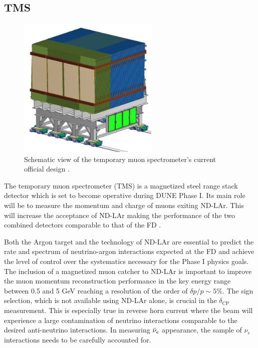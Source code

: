 \subsection{TMS}
\label{Sec:TMS-Official}
\begin{figure}[t]
     \centering
     \includegraphics[width=0.6\textwidth]{figures/ch3-DUNE/TMS.png}
     \caption[Schematic view of the temporary muon spectrometer's current official design.]{Schematic view of the temporary muon spectrometer's current official design \cite{Battisti:2022ND}.}
        \label{fig:TMS}
\end{figure}
The temporary muon spectrometer (TMS) is a magnetized steel range stack detector which is set to become operative during DUNE Phase I. Its main role will be to measure the momentum and charge of muons exiting ND-LAr. This will increase the acceptance of ND-LAr making the performance of the two combined detectors comparable to that of the FD \cite{DUNE:2022aul}.

Both the Argon target and the technology of ND-LAr are essential to predict the rate and spectrum of neutrino-argon interactions expected at the FD and achieve the level of control over the systematics necessary for the Phase I physics goals. The inclusion of a magnetized muon catcher to ND-LAr is important to improve the muon momentum reconstruction performance in the key energy range between 0.5 and 5 GeV reaching a resolution of the order of $\delta p / p \sim 5\%$. The sign selection, which is not available using ND-LAr alone, is crucial in the $\delta_\textrm{CP}$ measurement. This is especially true in reverse horn current where the beam will experience a large contamination of neutrino interactions comparable to the desired anti-neutrino interactions. In measuring $\Bar{\nu}_e$ appearance, the sample of $\nu_e$ interactions needs to be carefully accounted for.

